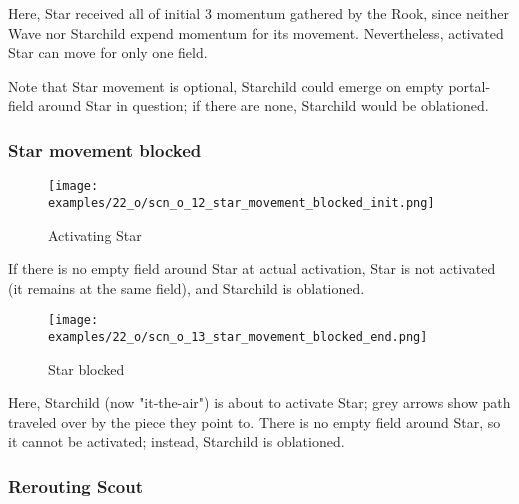 Here, Star received all of initial 3 momentum gathered by the Rook, since neither
Wave nor Starchild expend momentum for its movement. Nevertheless, activated Star
can move for only one field.

Note that Star movement is optional, Starchild could emerge on empty portal-field
around Star in question; if there are none, Starchild would be oblationed.

\clearpage %

\subsubsection*{Star movement blocked}
\label{sec:One/Starchild/Movement/Star movement blocked}

\noindent
\begin{wrapfigure}[4]{l}{0.4\textwidth}
\centering
\texttt{[image: examples/22\_o/scn\_o\_12\_star\_movement\_blocked\_init.png]}
\caption{Activating Star}
\label{fig:scn_o_12_star_movement_blocked_init}
\end{wrapfigure}
If there is no empty field around Star at actual activation, Star is not activated
(it remains at the same field), and Starchild is oblationed.

\vspace*{4.1\baselineskip}
\noindent
\begin{wrapfigure}[7]{l}{0.4\textwidth}
\centering
\texttt{[image: examples/22\_o/scn\_o\_13\_star\_movement\_blocked\_end.png]}
\caption{Star blocked}
\label{fig:scn_o_13_star_movement_blocked_end}
\end{wrapfigure}
Here, Starchild (now "it-the-air") is about to activate Star; grey arrows show path
traveled over by the piece they point to. There is no empty field around Star, so it
cannot be activated; instead, Starchild is oblationed.

\subsubsection*{Rerouting Scout}
\label{sec:One/Starchild/Movement/Rerouting Scout}

